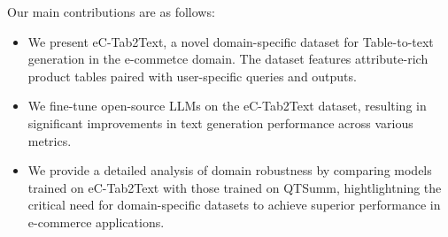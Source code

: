 Our main contributions are as follows: 

\begin{itemize}
    \item We present eC-Tab2Text, a novel domain-specific dataset for Table-to-text generation in the e-commetce domain. The dataset features attribute-rich product tables paired with user-specific queries and outputs.

    \item We fine-tune open-source LLMs on the eC-Tab2Text dataset, resulting in significant improvements in text generation performance across various metrics.
    
    \item We provide a detailed analysis of domain robustness by comparing models trained on eC-Tab2Text with those trained on QTSumm, hightlightning the critical need for domain-specific datasets to achieve superior performance in e-commerce applications.
\end{itemize}